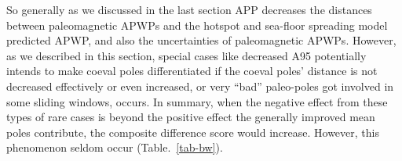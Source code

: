 So generally as we discussed in the last section APP decreases the distances
between paleomagnetic APWPs and the hotspot and sea-floor spreading model
predicted APWP, and also the uncertainties of paleomagnetic APWPs. However, as
we described in this section, special cases like decreased A95 potentially
intends to make coeval poles differentiated if the coeval poles' distance is
not decreased effectively or even increased, or very ``bad'' paleo-poles got
involved in some sliding windows, occurs. In summary, when the negative effect
from these types of rare cases is beyond the positive effect the generally
improved mean poles contribute, the composite difference score would increase.
However, this phenomenon seldom occur (Table.~\ref{tab-bw}).

\begin{table*}
\centering
\caption{One example of the Type 1 rare cases where AMP gives better similarity
  result than APP does from North America (101). Only statistically significant
  values are listed here.}
\label{tab-w3p4vs5}
\end{table*}
